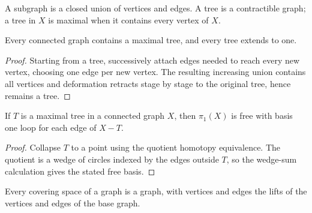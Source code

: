 \begin{definition}
\label{def:subgraph-and-tree}
\leanok
{}
A subgraph is a closed union of vertices and edges. A tree is a contractible
graph; a tree in $X$ is maximal when it contains every vertex of $X$.
\end{definition}

\begin{proposition}
\label{prop:maximal-tree-exists}
Every connected graph contains a maximal tree, and every tree extends to one.
\end{proposition}

\begin{proof}
\sketch Starting from a tree, successively attach edges needed to reach every
new vertex, choosing one edge per new vertex. The resulting increasing union
contains all vertices and deformation retracts stage by stage to the original
tree, hence remains a tree.
\end{proof}

\begin{proposition}
\label{prop:fundamental-group-of-graph-is-free}
If $T$ is a maximal tree in a connected graph $X$, then $\pi_1(X)$ is free
with basis one loop for each edge of $X-T$.
\end{proposition}

\begin{proof}
\sketch Collapse $T$ to a point using the quotient homotopy equivalence. The
quotient is a wedge of circles indexed by the edges outside $T$, so the
wedge-sum calculation gives the stated free basis.
\end{proof}

\begin{lemma}
\label{lem:covering-space-of-graph-is-graph}
Every covering space of a graph is a graph, with vertices and edges the lifts
of the vertices and edges of the base graph.
\end{lemma}


